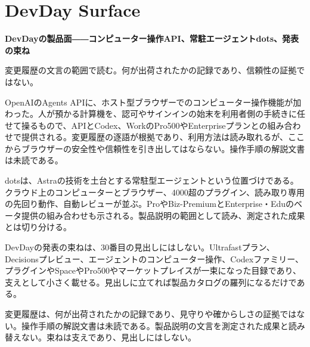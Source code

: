 \section{DevDay Surface}
\begin{wideflow}
{\Large\bfseries DevDayの製品面――コンピューター操作API、常駐エージェントdots、発表の束ね}\par
\smallskip
{\color{SurveyMuted}変更履歴の文言の範囲で読む。何が出荷されたかの記録であり、信頼性の証拠ではない。}\par
\end{wideflow}

OpenAIのAgents APIに、ホスト型ブラウザーでのコンピューター操作機能が加わった\cite{agentsapi}。人が預かる計算機を、認可やサインインの始末を利用者側の手続きに任せて操るもので、APIとCodex、WorkのPro500やEnterpriseプランとの組み合わせで提供される。変更履歴の逐語が根拠であり、利用方法は読み取れるが、ここからブラウザーの安全性や信頼性を引き出してはならない。操作手順の解説文書は未読である。

dotsは、Astraの技術を土台とする常駐型エージェントという位置づけである\cite{dots}。クラウド上のコンピューターとブラウザー、4000超のプラグイン、読み取り専用の先回り動作、自動レビューが並ぶ。ProやBiz-PremiumとEnterprise・Eduのベータ提供の組み合わせも示される。製品説明の範囲として読み、測定された成果とは切り分ける。

DevDayの発表の束ねは、30番目の見出しにはしない\cite{devday}。Ultrafastプラン、Decisionsプレビュー、エージェントのコンピューター操作、Codexファミリー、プラグインやSpaceやPro500やマーケットプレイスが一束になった目録であり、支えとして小さく載せる。見出しに立てれば製品カタログの羅列になるだけである。

\begin{claimboundary}[資料と評価の境界]
変更履歴は、何が出荷されたかの記録であり、見守りや確からしさの証拠ではない。操作手順の解説文書は未読である。製品説明の文言を測定された成果と読み替えない。束ねは支えであり、見出しにはしない。
\end{claimboundary}
